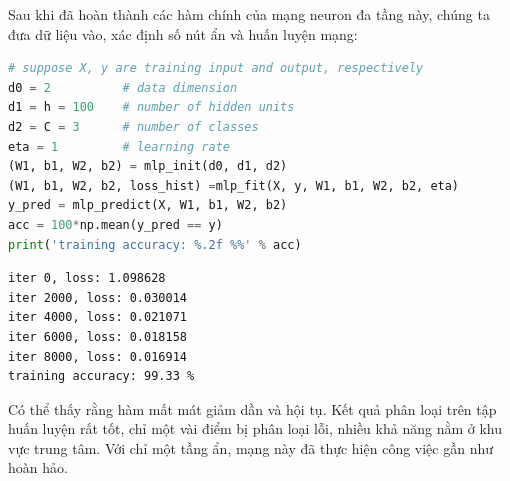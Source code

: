 Sau khi đã hoàn thành các hàm chính của mạng neuron đa tầng này, chúng ta
đưa dữ liệu vào, xác định số nút ẩn và huấn luyện mạng:
\begin{lstlisting}[language=Python]
# suppose X, y are training input and output, respectively 
d0 = 2          # data dimension 
d1 = h = 100    # number of hidden units 
d2 = C = 3      # number of classes 
eta = 1         # learning rate
(W1, b1, W2, b2) = mlp_init(d0, d1, d2)
(W1, b1, W2, b2, loss_hist) =mlp_fit(X, y, W1, b1, W2, b2, eta)
y_pred = mlp_predict(X, W1, b1, W2, b2)
acc = 100*np.mean(y_pred == y)
print('training accuracy: %.2f %%' % acc)
\end{lstlisting}
\kq
\begin{lstlisting}
iter 0, loss: 1.098628
iter 2000, loss: 0.030014
iter 4000, loss: 0.021071
iter 6000, loss: 0.018158
iter 8000, loss: 0.016914
training accuracy: 99.33 %
\end{lstlisting}
Có thể thấy rằng hàm mất mát giảm dần và hội tụ. Kết quả phân loại trên tập
huấn luyện rất tốt, chỉ một vài điểm bị phân loại lỗi, nhiều khả năng nằm
ở khu vực trung tâm. Với chỉ một tầng ẩn, mạng này đã thực hiện công việc
gần như hoàn hảo. 
